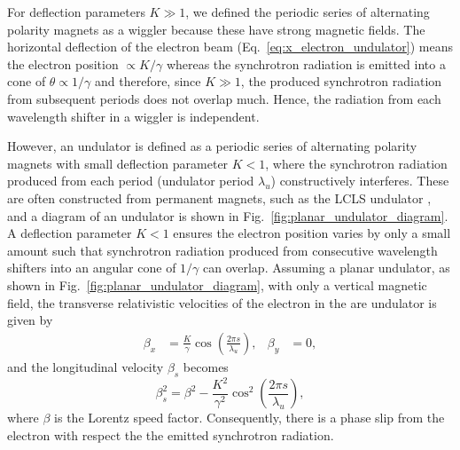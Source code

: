 \documentclass[../main.tex]{subfiles}
\begin{document}
For deflection parameters $K \gg 1$, we defined the periodic series of alternating polarity magnets as a wiggler because these have strong magnetic fields. The horizontal deflection of the electron beam (Eq.~\ref{eq:x_electron_undulator}) means the electron position $\propto K/\gamma$ whereas the synchrotron radiation is emitted into a cone of $\theta \propto 1/\gamma$ and therefore, since $K \gg 1$, the produced synchrotron radiation from subsequent periods does not overlap much. Hence, the radiation from each wavelength shifter in a wiggler is independent.

However, an undulator is defined as a periodic series of alternating polarity magnets with small deflection parameter $K < 1$, where the synchrotron radiation produced from each period (undulator period $\lambda_{u}$) constructively interferes. These are often constructed from permanent magnets, such as the LCLS undulator \cite{wallen2016status}, and a diagram of an undulator is shown in Fig.~\ref{fig:planar_undulator_diagram}. A deflection parameter $K < 1$ ensures the electron position varies by only a small amount such that synchrotron radiation produced from consecutive wavelength shifters into an angular cone of $1/\gamma$ can overlap. Assuming a planar undulator, as shown in Fig.~\ref{fig:planar_undulator_diagram}, with only a vertical magnetic field, the transverse relativistic velocities of the electron in the are undulator is given by
\begin{align}
\beta_{x} &= \frac{K}{\gamma}\cos\left(\frac{2\pi s}{\lambda_{u}}\right), & \beta_{y} &= 0,
\label{eq:transverse_undulator_velocity}    
\end{align}
and the longitudinal velocity $\beta_{s}$ becomes
\begin{equation}
\beta_{s}^{2} = \beta^{2}-\frac{K^{2}}{\gamma^{2}}\cos^{2}\left(\frac{2\pi s}{\lambda_{u}}\right),
\label{eq:longitudinal_undulator_velocity}
\end{equation}
where $\beta$ is the Lorentz speed factor. Consequently, there is a phase slip from the electron with respect the the emitted synchrotron radiation.
\end{document}

